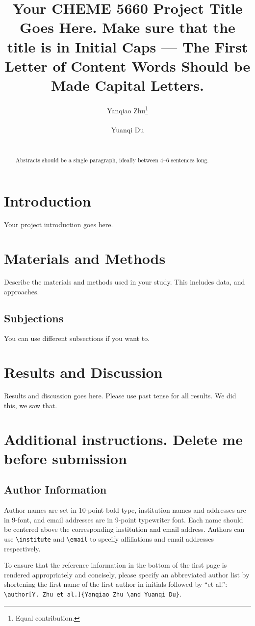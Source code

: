 \documentclass{article}
\title[CHEME 5660 Project, Fall 2022]{Your CHEME 5660 Project Title Goes Here. Make sure that the title is in Initial Caps --- The First Letter of Content Words Should be Made Capital Letters.}
\author[Y. Zhu et al.]{%
Yanqiao Zhu\thanks{Equal contribution.}\\
\institute{University of California, Los Angeles}\\
\email{yzhu@cs.ucla.edu}\And
Yuanqi Du\footnotemark[1]\\
\institute{Cornell University}\\
\email{yd392@cornell.edu}
}
\begin{document}
\maketitle

\begin{abstract}
Abstracts should be a single paragraph, ideally between 4--6 sentences long.
\end{abstract}

\section{Introduction}
Your project introduction goes here. 

\section{Materials and Methods}
Describe the materials and methods used in your study. This includes data, and approaches. 

\subsection{Subjections}
You can use different subsections if you want to.

\section{Results and Discussion}
Results and discussion goes here. Please use past tense for all results. We did this, we saw that. 


\section{Additional instructions. Delete me before submission}

\subsection{Author Information}
Author names are set in 10-point bold type, institution names and addresses are in 9-font, and email addresses are in 9-point typewriter font.
Each name should be centered above the corresponding institution and email address.
Authors can use \verb+\institute+ and \verb+\email+ to specify affiliations and email addresses respectively.

To ensure that the reference information in the bottom of the first page is rendered appropriately and concisely, 
please specify an abbreviated author list by shortening the first name of the first author in initials followed by 
``et al.'': \verb+\author[Y. Zhu et al.]{Yanqiao Zhu \and Yuanqi Du}+.
\end{document}

